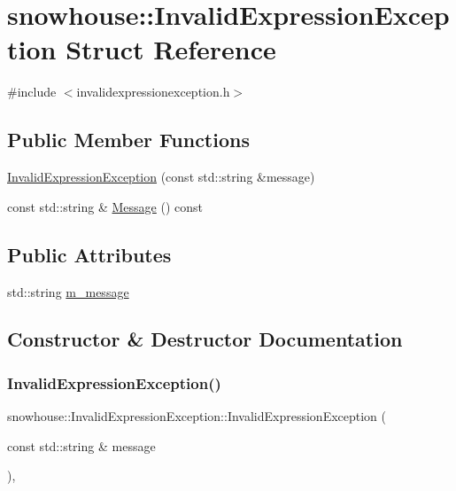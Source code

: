 \hypertarget{structsnowhouse_1_1InvalidExpressionException}{}\section{snowhouse\+::Invalid\+Expression\+Exception Struct Reference}
\label{structsnowhouse_1_1InvalidExpressionException}


{\ttfamily \#include $<$invalidexpressionexception.\+h$>$}

\subsection*{Public Member Functions}
\begin{DoxyCompactItemize}
\item 
\mbox{\hyperlink{structsnowhouse_1_1InvalidExpressionException_a65036dd90bfd4696d588f676feefc480}{Invalid\+Expression\+Exception}} (const std\+::string \&message)
\item 
const std\+::string \& \mbox{\hyperlink{structsnowhouse_1_1InvalidExpressionException_a70e392435e5c189d9bf1fd130abec75b}{Message}} () const
\end{DoxyCompactItemize}
\subsection*{Public Attributes}
\begin{DoxyCompactItemize}
\item 
std\+::string \mbox{\hyperlink{structsnowhouse_1_1InvalidExpressionException_a21b5f91ff631cb83fbd492f8604d8013}{m\+\_\+message}}
\end{DoxyCompactItemize}


\subsection{Constructor \& Destructor Documentation}
\mbox{\label{structsnowhouse_1_1InvalidExpressionException_a65036dd90bfd4696d588f676feefc480}} 
\subsubsection{\texorpdfstring{InvalidExpressionException()}{InvalidExpressionException()}}
{\footnotesize\ttfamily snowhouse\+::\+Invalid\+Expression\+Exception\+::\+Invalid\+Expression\+Exception (\begin{DoxyParamCaption}\item[{const std\+::string \&}]{message }\end{DoxyParamCaption})\hspace{0.3cm}{\ttfamily [inline]}, {\ttfamily [explicit]}}



